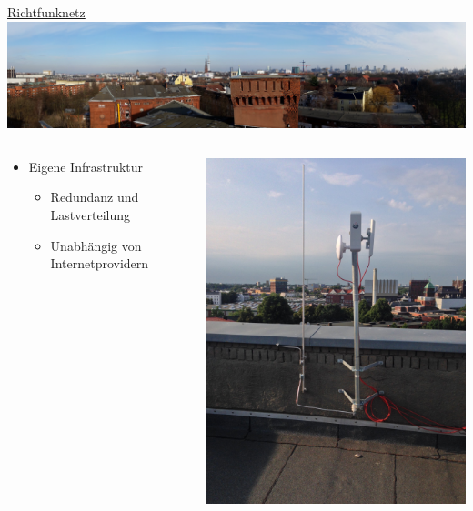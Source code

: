 \documentclass[t]{beamer}
\begin{document}
  \begin{frame}{\href{http://wiki.freifunk.net/Hamburg/Richtfunknetz}{Richtfunknetz}}
    \includegraphics[width=\textwidth]{Bilder/fux-panorama}
    \begin{columns}
      \begin{column}{0.7\textwidth}
  \begin{itemize}
    \item Eigene Infrastruktur
    \begin{itemize}
      \item Redundanz und Lastverteilung 
      \item Unabhängig von Internetprovidern
    \end{itemize}
  \end{itemize}
      \end{column}
      \begin{column}{0.3\textwidth}
  \begin{center}
    \includegraphics[width=.9\textwidth]{Bilder/richtfunkmast}
  \end{center}
      \end{column}
    \end{columns}
  \end{frame}
  
\end{document}
